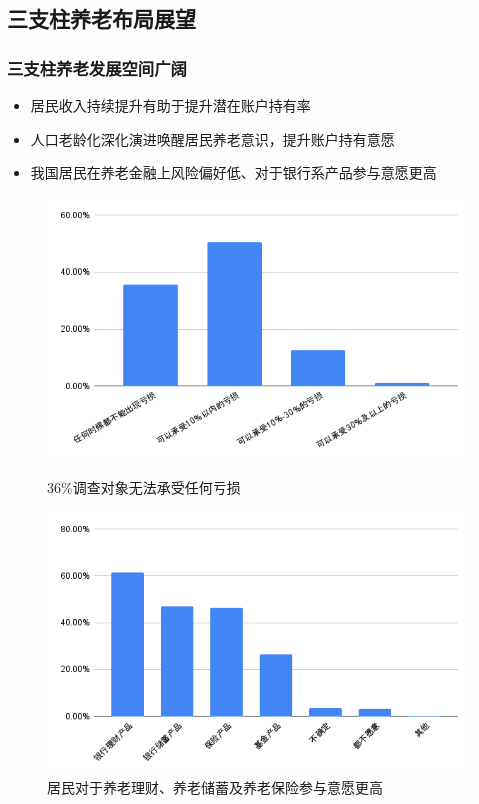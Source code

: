 \documentclass[a4paper,zihao=5]{ctexbeamer}
\begin{document}
\subsection{三支柱养老布局展望}
\begin{frame}
    \frametitle{三支柱养老发展空间广阔}
    \begin{itemize}
        \item 居民收入持续提升有助于提升潜在账户持有率
        \item 人口老龄化深化演进唤醒居民养老意识，提升账户持有意愿
        \item 我国居民在养老金融上风险偏好低、对于银行系产品参与意愿更高
    \end{itemize}
    \begin{figure}[H]
        \begin{minipage}{0.48\linewidth}
            \includegraphics[width=\linewidth]{img/36调查对象无法承受任何亏损.png}
            \caption{36\%调查对象无法承受任何亏损}
        \end{minipage}
        \begin{minipage}{0.48\linewidth}
            \includegraphics[width=\linewidth]{img/居民对于养老理财、养老储蓄及养老保险参与意愿更高.png}
            \caption{居民对于养老理财、养老储蓄及养老保险参与意愿更高}
        \end{minipage}
    \end{figure}

\end{frame}
\end{document}
